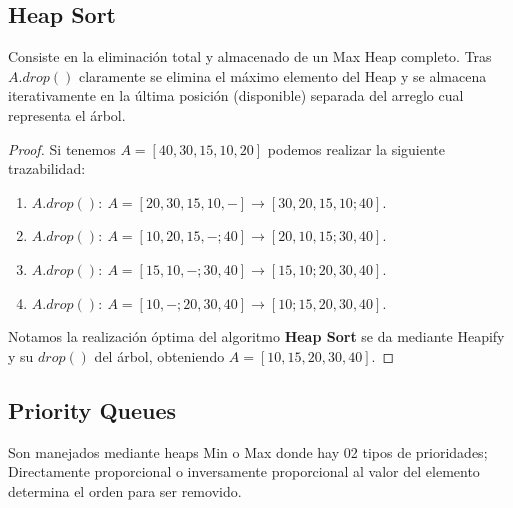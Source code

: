
\subsection{Heap Sort}
Consiste en la eliminación total y almacenado de un Max Heap completo. Tras $A.drop()$ claramente se elimina el máximo elemento del Heap y se almacena iterativamente en la última posición (disponible) separada del arreglo cual representa el árbol.
\begin{proof}
	Si tenemos $A=[40,30,15,10,20]$ podemos realizar la siguiente trazabilidad:
	\begin{enumerate}
		\item $A.drop():~A=[20,30,15,10,-]
			      \to [30,20,15,10;40]$.
		\item $A.drop():~A=[10,20,15,-;40]
			      \to [20,10,15;30,40]$.
		\item $A.drop():~A=[15,10,-;30,40]
			      \to [15,10;20,30,40]$.
		\item $A.drop():~A=[10,-;20,30,40]
			      \to [10;15,20,30,40]$.
	\end{enumerate}

	Notamos la realización óptima del algoritmo \textbf{Heap Sort} se da mediante Heapify y su $drop()$ del árbol, obteniendo $A=[10,15,20,30,40]$.
\end{proof}

\subsection{Priority Queues}
Son manejados mediante heaps Min o Max donde hay 02 tipos de prioridades; Directamente proporcional o inversamente proporcional al valor del elemento determina el orden para ser removido.